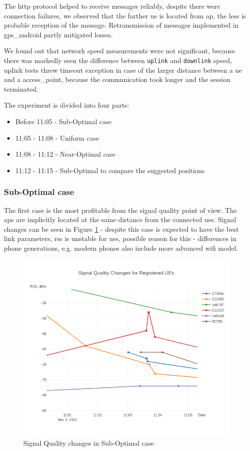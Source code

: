 The \gls{http} protocol helped to receive messages reliably, despite there were connection failures, we observed that the farther \gls{ue} is located from \gls{ap}, the less is probable reception of the message. Retransmission of messages implemented in \gls{gps_android} partly mitigated losses.

We found out that network speed measurements were not significant, because there was markedly seen the difference between \texttt{uplink} and \texttt{downlink} speed, uplink tests threw timeout exception in case of the larger distance between a \gls{ue} and a \gls{access_point}, because the communication took longer and the session terminated. 

The experiment is divided into four parts:

\begin{itemize}
	\tightlist
	\item
	Before 11:05 - Sub-Optimal case
	\item
	11:05 - 11:08 - Uniform case
	\item
	11:08 - 11:12 - Near-Optimal case
	\item
	11:12 - 11:15 - Sub-Optimal to compare the suggested positions
\end{itemize}

\subsubsection{Sub-Optimal case}

The first case is the most profitable from the signal quality point of
view. The \glspl{ap} are implicitly located at the same distance from the
connected \glspl{ue}. Signal changes can be seen in Figure \ref{fig:signal-quality-changes-sub-optimal} - despite this case is expected to have the best link parameters, \acrshort{rss} is unstable for \glspl{ue}, possible reason for this - differences in phone generations, e.g. modern phones also include more advanced \gls{wifi} model.

\begin{figure}[H]
	\centering
	\includegraphics[width=0.7\linewidth,keepaspectratio]{images/Exp4_Suboptimal.png}
	\caption{Signal Quality changes in Sub-Optimal case}
	\label{fig:signal-quality-changes-sub-optimal}
\end{figure}

